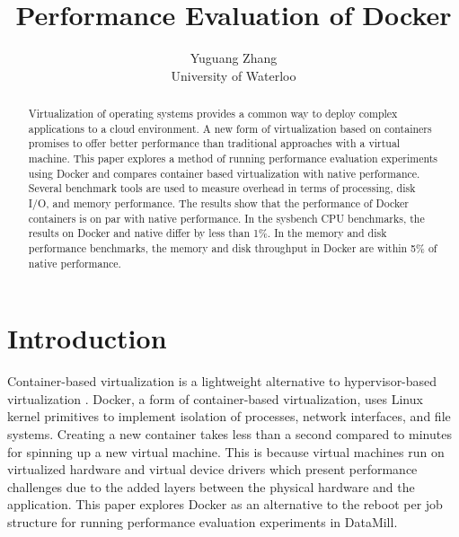 \documentclass[11pt]{article}
\begin{document}
	
	\thispagestyle{empty}
	
	\title{Performance Evaluation of Docker}
	
	\author{Yuguang Zhang \\ University of Waterloo}
	
	\maketitle
	
	
	\begin{abstract}
		Virtualization of operating systems provides a common way to deploy complex
		applications to a cloud environment. A new form of virtualization based on containers
		promises to offer better performance than traditional approaches with a virtual machine.
		This paper explores a method of running performance evaluation experiments using
		Docker and compares container based virtualization with native performance. Several
		benchmark tools are used to measure overhead in terms of processing, disk I/O,
		and memory performance. The results show that the performance of Docker containers is on par with native performance. In the sysbench CPU benchmarks, the results on Docker and native differ by less than 1\%. In the memory and disk performance benchmarks, the memory and disk throughput in Docker are within 5\% of native performance.
	\end{abstract}
	
	\section{Introduction}
	Container-based virtualization is a lightweight alternative to hypervisor-based virtualization \cite{morabito}. Docker, a form of container-based virtualization, uses Linux kernel primitives to implement isolation of processes, network interfaces, and file systems. Creating a new container takes less than a second compared to minutes for spinning up a new virtual machine. This is because virtual machines run on virtualized hardware and virtual device drivers which present performance challenges due to the added layers between the physical hardware and the application. This paper explores Docker as an alternative to the reboot per job structure for running performance evaluation experiments in DataMill.
	
\end{document}

